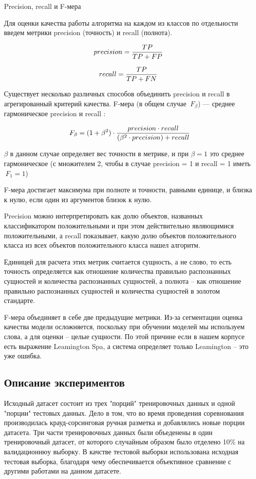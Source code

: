 \documentclass{article}
\begin{document}
Precision, recall и F-мера

Для оценки качества работы алгоритма на каждом из классов по отдельности введем метрики precision (точность) и recall (полнота).


$$\large precision = \frac{TP}{TP + FP}$$



$$\large recall = \frac{TP}{TP + FN}$$

Существует несколько различных способов объединить precision и recall в агрегированный критерий качества. F-мера (в общем случае $\ F_\beta$) — среднее гармоническое precision и recall :


$$\large \ F_\beta = (1 + \beta^2) \cdot \frac{precision \cdot recall}{(\beta^2 \cdot precision) + recall}$$


$\beta$ в данном случае определяет вес точности в метрике, и при $\beta = 1$ это среднее гармоническое (с множителем 2, чтобы в случае precision = 1 и recall = 1 иметь $\ F_1 = 1$)

F-мера достигает максимума при полноте и точности, равными единице, и близка к нулю, если один из аргументов близок к нулю.

Precision можно интерпретировать как долю объектов, названных классификатором положительными и при этом действительно являющимися положительными, а recall показывает, какую долю объектов положительного класса из всех объектов положительного класса нашел алгоритм.

Единицей для расчета этих метрик считается сущность, а не слово, то есть точность определяется как отношение количества правильно распознанных сущностей и количества распознанных сущностей, а полнота – как отношение правильно распознанных сущностей и количества сущностей в золотом стандарте. 

F-мера объединяет в себе две предыдущие метрики.
Из-за сегментации оценка качества модели осложняется, поскольку при обучении моделей мы используем слова, а для оценки – целые сущности. По этой причине если в нашем корпусе есть выражение Leamington Spa, а система определяет только Leamington – это уже ошибка.


\subsection{Описание экспериментов}
Исходный датасет состоит из трех "порций" тренировочных данных и одной "порции" тестовых данных. Дело в том, что во время проведения соревнования производилась крауд-сорсинговая ручная разметка и добавлялись новые порции датасета. Три части тренировочных данных были объеденены в один тренировочный датасет, от которого случайным образом было отделено 10\% на валидационнюу выборку. В качстве тестовой выборки использована исходная тестовая выборка, благодаря чему обеспечивается объективное сравнение с другими работами на данном датасете.
\newline
\end{document}
